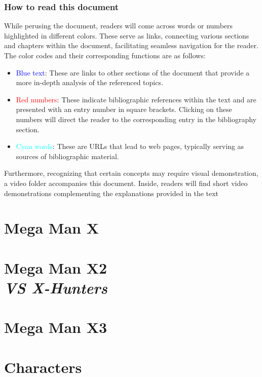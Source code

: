 \documentclass[openany]{report}
\begin{document}
	\section*{How to read this document}
	While perusing the document, readers will come across words or numbers highlighted in different colors. These serve as links, connecting various sections and chapters within the document, facilitating seamless navigation for the reader. The color codes and their corresponding functions are as follows:
	\begin{itemize}
		
	\item \textcolor{blue}{Blue text}: These are links to other sections of the document that provide a more in-depth analysis of the referenced topics.
	
	\item \textcolor{red}{Red numbers}: These indicate bibliographic references within the text and are presented with an entry number in square brackets. Clicking on these numbers will direct the reader to the corresponding entry in the bibliography section.
	
	\item \textcolor{cyan}{Cyan words}: These are URLs that lead to web pages, typically serving as sources of bibliographic material.
	\end{itemize}
	
	Furthermore, recognizing that certain concepts may require visual demonstration, a video folder accompanies this document. Inside, readers will find short video demonstrations complementing the explanations provided in the text
	

\part{Mega Man X}

\label{cha:X1}
%

\part[Mega Man X2]{Mega Man X2\\[2ex]\Large\itshape{VS X-Hunters}}
\label{cha:X2}
%
	
\part{Mega Man X3}
\label{cha:X3}
%
\part{Characters}
\end{document}
